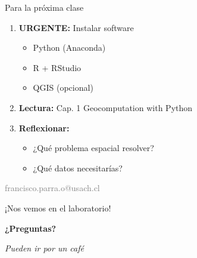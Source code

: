 \documentclass[10pt]{beamer}
\begin{document}
\begin{frame}{Para la próxima clase}
    \begin{enumerate}
        \item \textcolor{red}{} \textbf{URGENTE:} Instalar software
        \begin{itemize}
            \item Python (Anaconda)
            \item R + RStudio
            \item QGIS (opcional)
        \end{itemize}
        
        \item \textcolor{blue}{} \textbf{Lectura:} Cap. 1 Geocomputation with Python
        
        \item \textcolor{green}{} \textbf{Reflexionar:} 
        \begin{itemize}
            \item ¿Qué problema espacial resolver?
            \item ¿Qué datos necesitarías?
        \end{itemize}
    \end{enumerate}
    
    \vspace{0.5cm}
    \begin{center}
        \textcolor{gray}{ francisco.parra.o@usach.cl}
    \end{center}
\end{frame}

\begin{frame}{¡Nos vemos en el laboratorio!}
    \begin{center}
        \Large{\textbf{¿Preguntas?}}
        
        \vspace{1cm}
        
        
        \vspace{1cm}
        
        \textcolor{usachred}{} \textit{Pueden ir por un café}
    \end{center}
\end{frame}
\end{document}
